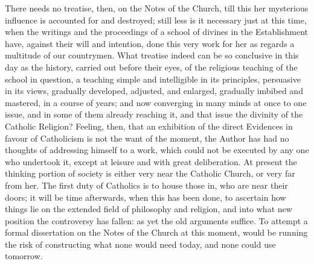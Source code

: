 There needs no treatise, then, on the Notes of the Church, till
this her mysterious influence is accounted for and destroyed; still
less is it necessary just at this time, when the writings and the
proceedings of a school of divines in the Establishment have, against
their will and intention, done this very work for her as regards a
multitude of our countrymen. What treatise indeed can be so conclusive
in this day as the history, carried out before their eyes, of the
religious teaching of the school in question, a teaching simple and
intelligible in its principles, persuasive in its views, gradually
developed, adjusted, and enlarged, gradually imbibed and mastered, in
a course of years; and now converging in many minds at once to one
issue, and in some of them already reaching it, and that issue the
divinity of the Catholic Religion? Feeling, then, that an exhibition
of the direct Evidences in favour of Catholicism is not the want of
the moment, the Author has had no thoughts of addressing himself to a
work, which could not be executed by any one who undertook it, except
at leisure and with great deliberation. At present the thinking
portion of society is either very near the Catholic Church, or very
far from her. The first duty of Catholics is to house those in, who
are near their doors; it will be time afterwards, when this has been
done, to ascertain how things lie on the extended field of philosophy
and religion, and into what new position the controversy has fallen:
as yet the old arguments suffice. To attempt a formal dissertation on
the Notes of the Church at this moment, would be running the risk of
constructing what none would need today, and none could use tomorrow.


